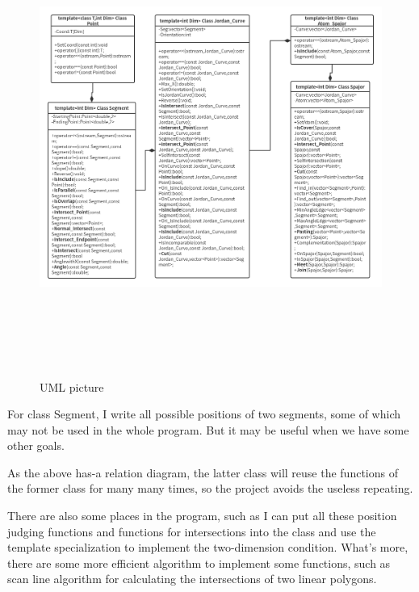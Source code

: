 \documentclass[twoside,a4paper]{article}
\begin{document}
\begin{figure}[H]
  \begin{center}
  \includegraphics[height=15cm]{./pic/UML.png}
  \caption{UML picture}
  \end{center}
  \label{fig:figure1}
\end{figure}

\newpage

For class Segment, I write all possible positions of two segments,
some of which may not be used in the whole program. But it may be
useful when we have some other goals.

As the above has-a relation diagram, the latter class will reuse the
functions of the former class for many many times, so the project
avoids the useless repeating.

There are also some places in the program, such as I can put all these position
judging functions and functions for intersections into the class and
use the template specialization to implement the two-dimension
condition. What's more, there are some more efficient algorithm to
implement some functions, such as scan line algorithm for calculating
the intersections of two linear polygons.
\end{document}
